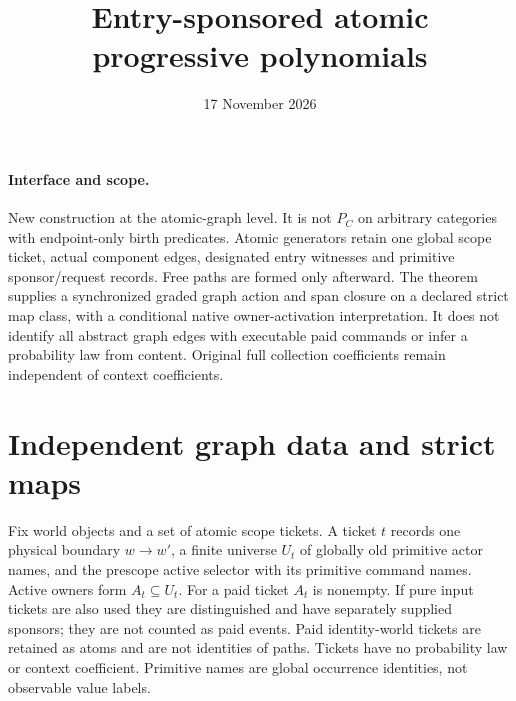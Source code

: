 \documentclass[11pt]{article}
\title{Entry-sponsored atomic progressive polynomials}
\date{17 November 2026}
\begin{document}
\maketitle
\paragraph{Interface and scope.}
New construction at the atomic-graph level. It is not $P_C$ on arbitrary categories with endpoint-only birth predicates. Atomic generators retain one global scope ticket, actual component edges, designated entry witnesses and primitive sponsor/request records. Free paths are formed only afterward. The theorem supplies a synchronized graded graph action and span closure on a declared strict map class, with a conditional native owner-activation interpretation. It does not identify all abstract graph edges with executable paid commands or infer a probability law from content. Original full collection coefficients remain independent of context coefficients.

\section{Independent graph data and strict maps}
Fix world objects and a set of atomic scope tickets. A ticket $t$ records one physical boundary $w\to w'$, a finite universe $U_t$ of globally old primitive actor names, and the prescope active selector with its primitive command names. Active owners form $A_t\subseteq U_t$. For a paid ticket $A_t$ is nonempty. If pure input tickets are also used they are distinguished and have separately supplied sponsors; they are not counted as paid events. Paid identity-world tickets are retained as atoms and are not identities of paths. Tickets have no probability law or context coefficient. Primitive names are global occurrence identities, not observable value labels.
\end{document}
